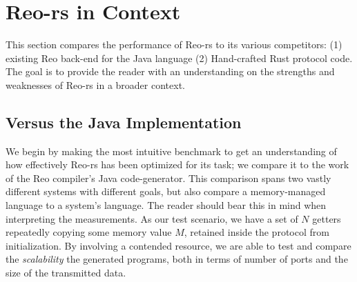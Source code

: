 %
%
%
%
%
%

\section{Reo-rs in Context}
This section compares the performance of Reo-rs to its various competitors: (1) existing Reo back-end for the Java language (2) Hand-crafted Rust protocol code. The goal is to provide the reader with an understanding on the strengths and weaknesses of Reo-rs in a broader context.

\subsection{Versus the Java Implementation}
We begin by making the most intuitive benchmark to get an understanding of how effectively Reo-rs has been optimized for its task; we compare it to the work of the Reo compiler's Java code-generator. This comparison spans two vastly different systems with different goals, but also compare a memory-managed language to a system's language. The reader should bear this in mind when interpreting the measurements. As our test scenario, we have a set of $N$ getters repeatedly copying some memory value $M$, retained inside the protocol from initialization. By involving a contended resource, we are able to test and compare the \textit{scalability} the generated programs, both in terms of number of ports and the size of the transmitted data.

